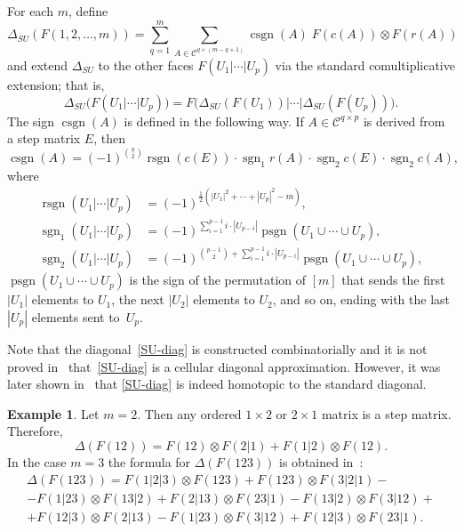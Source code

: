 \documentclass[a4paper,12pt]{amsart}
\theoremstyle{definition}
\newtheorem{example}[formula]{Example}
\theoremstyle{remark}
\numberwithin{equation}{section}
\begin{document}
For each $m$, define
\begin{equation}\label{SU-diag}
\Delta_{SU}(F(1, 2, \ldots, m)) = \sum_{q = 1}^m \sum_{A \in \mathcal{C}^{q \times (m-q+1)}} \mathop{\mathrm{csgn}}(A)\; F(c(A)) \otimes F(r(A))
\end{equation}
and extend $\Delta_{SU}$ to the other faces $F(U_1 | \cdots | U_p)$ via the standard comultiplicative extension; that is, 
\begin{equation}\label{comulrule}
  \Delta_{SU}\bigl(F(U_1| \cdots | U_p)\bigr) = 
  F\bigl(\Delta_{SU}(F(U_1)) \big| \cdots \big| \Delta_{SU}(F(U_p))\bigl).
\end{equation}
The sign $\mathop\mathrm{csgn}(A)$ is defined in the following way.
If $A \in \mathcal{C}^{q \times p}$ is derived from a step matrix $E$, then
\[
  \mathop{\mathrm{csgn}}(A) = (-1)^{\binom q2} 
  \mathop{\mathrm{rsgn}}(c(E)) \cdot \mathop{\mathrm{sgn}}\nolimits_1 r(A) \cdot \mathop{\mathrm{sgn}}\nolimits_2 c(E) \cdot \mathop{\mathrm{sgn}}\nolimits_2 c(A),
\]  
where
\begin{align*}
  \mathop{\mathrm{rsgn}}(U_1 | \cdots |U_p) &= (-1)^{\frac12(|U_1|^2 + \cdots + |U_p|^2 - m)},\\
  \mathop{\mathrm{sgn}}\nolimits_1(U_1 | \cdots | U_p) &= (-1)^{\sum_{i=1}^{p-1}i \cdot |U_{p-i}|} 
  \mathop{\mathrm{psgn}}(U_1 \cup \cdots \cup U_p),\\ 
  \mathop{\mathrm{sgn}}\nolimits_2(U_1 | \cdots | U_p) &= 
  (-1)^{{\binom{p-1}2} + \sum_{i=1}^{p-1}i \cdot |U_{p-i}|} 
  \mathop\mathrm{{psgn}}(U_1 \cup \cdots \cup U_p),
\end{align*}
$\mathop\mathrm{{psgn}}(U_1 \cup \cdots \cup U_p)$ is the sign of the permutation of $[m]$ that sends the first $|U_1|$ elements to $U_1$, the next $|U_2|$ elements to $U_2$, and so on, ending with the last $|U_p|$ elements sent to~$U_p$.

Note that the diagonal~\eqref{SU-diag} is constructed combinatorially and it is not proved in~\cite{SU} that~\eqref{SU-diag} is a cellular diagonal approximation.
However, it was later shown in~\cite{DLPS} that \eqref{SU-diag} is indeed homotopic to the standard diagonal.

\begin{example}
Let $m = 2$. Then any ordered $1\times 2$ or $2 \times 1$ matrix is a step matrix. Therefore,
$$\Delta(F(12)) = F(12) \otimes F(2|1) + F(1|2) \otimes F(12).$$
In the case $m = 3$ the formula for $\Delta(F(123))$ is obtained in~\cite{SU}: 
\begin{multline*}
  \Delta(F(123)) = F(1|2|3) \otimes F(123) + F(123) \otimes F(3|2|1) -\\ -F(1|23) \otimes F(13|2) + F(2|13) \otimes F(23|1) - F(13|2) \otimes F(3|12) +\\ 
  + F(12|3) \otimes F(2|13) - F(1|23) \otimes F(3|12) + F(12|3) \otimes F(23|1).
\end{multline*}  
\end{example}
\end{document}
